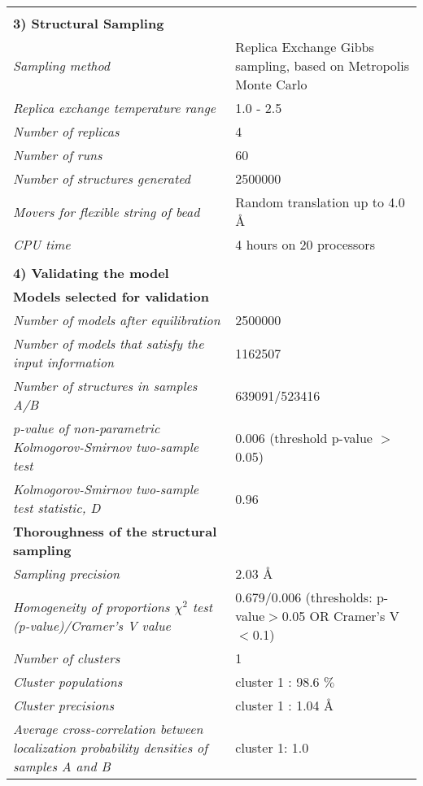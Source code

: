 \documentclass[8pt,a4paper]{article}
\begin{document}
\begin{longtable}{ p{} | p{} }
   &  \\
    \normalsize{\textbf{3) Structural Sampling}} & \\
    \hline
            \textit{Sampling method} & Replica Exchange Gibbs sampling, based on Metropolis Monte Carlo\\
                \textit{Replica exchange temperature range} & 1.0 - 2.5\\
                \textit{Number of replicas} & 4\\
                \textit{Number of runs} & 60\\
                \textit{Number of structures generated} & 2500000\\
                \textit{Movers for flexible string of bead} & Random translation up to 4.0 \AA\\
                \textit{CPU time} & 4 hours on 20 processors\\
        
   &  \\
  \normalsize{\textbf{4) Validating the model}} & \\
    \hline
   \textbf{Models selected for validation} & \\
    \hline
          \textit{Number of models after equilibration} & 2500000\\
                \textit{Number of models that satisfy the input information} & 1162507\\
                \textit{Number of structures in samples A/B} & 639091/523416\\
                \textit{p-value of non-parametric Kolmogorov-Smirnov two-sample test} & 0.006 (threshold p-value $>$ 0.05)\\
                \textit{Kolmogorov-Smirnov two-sample test statistic, D} & 0.96\\
           \hline
    
    \textbf{Thoroughness of the structural sampling} & \\
    \hline
          \textit{Sampling precision} & 2.03 \AA \\
                \textit{Homogeneity of proportions $\chi^2$ test (p-value)/Cramer’s V value} & 0.679/0.006 (thresholds: p-value$>$0.05 OR Cramer's V$<$0.1)\\
                \textit{Number of clusters} & 1\\
                \textit{Cluster populations} & cluster 1 : 98.6 $\%$\\
                \textit{Cluster precisions} & cluster 1 : 1.04 \AA\\
                \textit{Average cross-correlation between localization probability densities of samples A and B} & cluster 1: 1.0\\
           \hline
  

\end{longtable}
\end{document}
